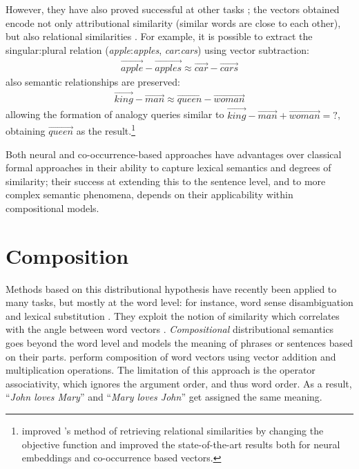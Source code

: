 However, they have also proved successful at other tasks
\cite{mikolov2013linguistic}; the vectors obtained encode not only
attributional similarity (similar words are close to each other), but
also relational similarities \cite{turney2006similarity}. For example,
it is possible to extract the singular:plural relation
(\textit{apple}:\textit{apples}, \textit{car}:\textit{cars}) using
vector subtraction:
%
\begin{align*}
  \overrightarrow{\mathit{apple}} - \overrightarrow{\mathit{apples}}
  \approx
  \overrightarrow{\mathit{car}} - \overrightarrow{\mathit{cars}}
\end{align*}
%
also semantic relationships are preserved:
%
\begin{align*}
  \overrightarrow{\mathit{king}} - \overrightarrow{\mathit{man}}
  \approx
  \overrightarrow{\mathit{queen}} - \overrightarrow{\mathit{woman}}
\end{align*}
%
allowing the formation of analogy queries similar to
$\overrightarrow{\mathit{king}} - \overrightarrow{\mathit{man}} +
\overrightarrow{\mathit{woman}} = \mathtt{?}$, obtaining
$\overrightarrow{\mathit{queen}}$ as the
result.\footnote{ improved
  's method of retrieving relational similarities
  by changing the objective function and improved the state-of-the-art results
  both for neural embeddings and co-occurrence based vectors.}

Both neural and co-occurrence-based approaches have advantages over
classical formal approaches in their ability to capture lexical
semantics and degrees of similarity; their success at extending this
to the sentence level, and to more complex semantic phenomena, depends
on their applicability within compositional models.

\section{Composition}
\label{sec:composition}

Methods based on this distributional hypothesis have recently been
applied to many tasks, but mostly at the word level: for instance,
word sense disambiguation \cite{zhitomirsky2009bootstrapping} and
lexical substitution \cite{thater2010}. They exploit the notion of
similarity which correlates with the angle between word vectors
\cite{turney2010frequency}.
%
\emph{Compositional} distributional semantics goes beyond the word level and
models the meaning of phrases or sentences based on their
parts.  perform composition of word vectors using
vector addition and multiplication operations. The limitation of this approach
is the operator associativity, which ignores the argument order, and thus word
order. As a result, ``\textit{John loves Mary}'' and ``\textit{Mary loves
  John}'' get assigned the same meaning.

